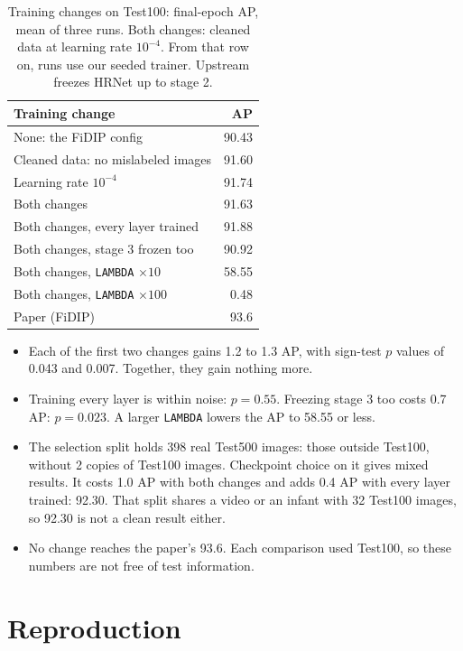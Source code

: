 \documentclass[11pt]{article}
\newcommand{\code}[1]{\texttt{#1}}
\begin{document}
\begin{table}[!htb]
\centering\small
\begin{tabular}{@{}lr@{}}
\toprule
Training change & AP \\
\midrule
None: the FiDIP config & 90.43 \\
Cleaned data: no mislabeled images & 91.60 \\
Learning rate $10^{-4}$ & 91.74 \\
Both changes & 91.63 \\
Both changes, every layer trained & 91.88 \\
Both changes, stage 3 frozen too & 90.92 \\
Both changes, \code{LAMBDA} $\times 10$ & 58.55 \\
Both changes, \code{LAMBDA} $\times 100$ & 0.48 \\
\midrule
Paper (FiDIP) & 93.6 \\
\bottomrule
\end{tabular}
\caption{Training changes on Test100: final-epoch AP, mean of three runs. Both changes: cleaned data at learning rate $10^{-4}$. From that row on, runs use our seeded trainer. Upstream freezes HRNet up to stage 2.}
\label{tab:changes}
\end{table}

\begin{itemize}
  \item Each of the first two changes gains 1.2 to 1.3 AP, with sign-test $p$ values of 0.043 and 0.007. Together, they gain nothing more.
  \item Training every layer is within noise: $p = 0.55$. Freezing stage 3 too costs 0.7 AP: $p = 0.023$. A larger \code{LAMBDA} lowers the AP to 58.55 or less.
  \item The selection split holds 398 real Test500 images: those outside Test100, without 2 copies of Test100 images. Checkpoint choice on it gives mixed results. It costs 1.0 AP with both changes and adds 0.4 AP with every layer trained: 92.30. That split shares a video or an infant with 32 Test100 images, so 92.30 is not a clean result either.
  \item No change reaches the paper's 93.6. Each comparison used Test100, so these numbers are not free of test information.
\end{itemize}

\section{Reproduction}
\label{sec:repro}
\end{document}
